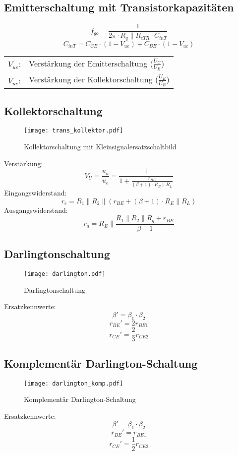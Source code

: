\subsection{Emitterschaltung mit Transistorkapazitäten}
\[
	f_{go} = \frac{1}{2\pi \cdot R_q \parallel R_{eTR} \cdot C_{inT}}
\]
\[
	C_{inT} = C_{CB} \cdot (1-V_{ue}) + C_{BE} \cdot (1-V_{uc})
\]
\begin{tabular}{@{}ll}
  $V_{ue}$:	    & Verstärkung der Emitterschaltung ($\frac{U_{C}}{U_{B}}$) \\
  $V_{uc}$:	    & Verstärkung der Kollektorschaltung ($\frac{U_{E}}{U_{B}}$) \\
\end{tabular}

\subsection{Kollektorschaltung}
\begin{figure}[h!]
	\centering
	\texttt{[image: trans\_kollektor.pdf]}
	\caption{Kollektorschaltung mit Kleinsignalersatzschaltbild}
	\label{trans:kollektroschaltung}
\end{figure}
\noindent
Verstärkung:
\[
	V_U = \frac{u_a}{u_e} = \frac{1}{1 + \frac{r_{BE}}{(\beta + 1) \cdot R_E \parallel R_L}}
\]
Eingangswiderstand:
\[
	r_e = R_1 \parallel R_2 \parallel (r_{BE} + (\beta+1) \cdot R_E \parallel R_L)
\]
Ausgangswiderstand:
\[
	r_a = R_E \parallel \frac{R_1 \parallel R_2 \parallel R_q + r_{BE}}{\beta + 1}
\]

\subsection{Darlingtonschaltung}
\begin{figure}[h!]
	\centering
	\texttt{[image: darlington.pdf]}
	\caption{Darlingtonschaltung}
	\label{trans:darlington}
\end{figure}
\noindent
Ersatzkennwerte:
\[ \beta' = \beta_1 \cdot \beta_2 \]
\[ r_{BE}' = 2r_{BE1} \]
\[ r_{CE}' = \frac{2}{3} r_{CE2} \]

\subsection{Komplementär Darlington-Schaltung}
\begin{figure}[h!]
	\centering
	\texttt{[image: darlington\_komp.pdf]}
	\caption{Komplementär Darlington-Schaltung}
	\label{trans:darlington_komp}
\end{figure}
\noindent
Ersatzkennwerte:
\[ \beta' = \beta_1 \cdot \beta_2 \]
\[ r_{BE}' = r_{BE1} \]
\[ r_{CE}' = \frac{1}{2} r_{CE2} \]